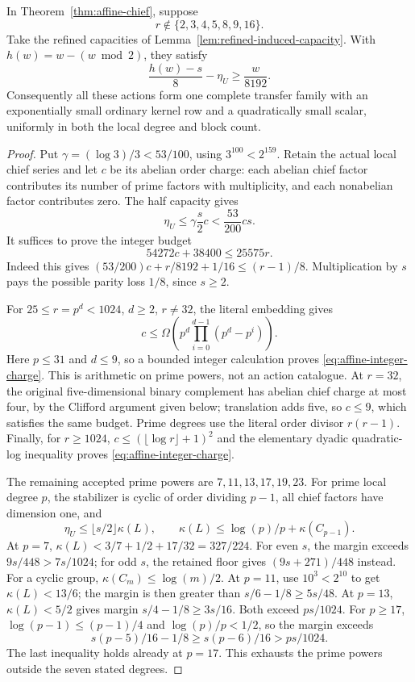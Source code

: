 \begin{theorem}
\label{thm:affine-local-capacity}
In Theorem~\ref{thm:affine-chief}, suppose
\[
 r\notin\{2,3,4,5,8,9,16\}.
\]
Take the refined capacities of Lemma~\ref{lem:refined-induced-capacity}.
With $h(w)=w-(w\bmod2)$, they satisfy
\[
 \frac{h(w)-s}{8}-\eta_U\geq\frac{w}{8192}.
\]
Consequently all these actions form one complete transfer family
with an exponentially small ordinary kernel row and a quadratically
small scalar, uniformly in both the local degree and block count.
\end{theorem}
\begin{proof}
Put $\gamma=(\log3)/3<53/100$, using $3^{100}<2^{159}$.
Retain the actual local chief series and let $c$ be its abelian order
charge: each abelian chief factor contributes its number of prime factors
with multiplicity, and each nonabelian factor contributes zero.
The half capacity gives
\[
 \eta_U\leq\gamma\frac{s}{2}c<\frac{53}{200}cs.
\]
It suffices to prove the integer budget
\begin{equation}\label{eq:affine-integer-charge}
 54272c+38400\leq25575r.
\end{equation}
Indeed this gives
$(53/200)c+r/8192+1/16\leq(r-1)/8$.
Multiplication by $s$ pays the possible parity loss $1/8$, since $s\geq2$.

For $25\leq r=p^d<1024$, $d\geq2$, $r\ne32$, the literal embedding gives
\[
 c\leq\Omega\!\left(p^d\prod_{i=0}^{d-1}(p^d-p^i)\right).
\]
Here $p\leq31$ and $d\leq9$, so a bounded integer calculation proves
\eqref{eq:affine-integer-charge}. This is arithmetic on prime powers,
not an action catalogue. At $r=32$, the original five-dimensional
binary complement has abelian chief charge at most four, by the
Clifford argument given below; translation adds five, so $c\leq9$,
which satisfies the same budget. Prime degrees use the literal order
divisor $r(r-1)$. Finally, for $r\geq1024$,
$c\leq(\lfloor\log r\rfloor+1)^2$ and the elementary dyadic
quadratic-log inequality proves \eqref{eq:affine-integer-charge}.

The remaining accepted prime powers are $7,11,13,17,19,23$.
For prime local degree $p$, the stabilizer is cyclic of order
dividing $p-1$, all chief factors have dimension one, and
\[
 \eta_U\leq\lfloor s/2\rfloor\kappa(L),\qquad
 \kappa(L)\leq\log(p)/p+\kappa(C_{p-1}).
\]
At $p=7$, $\kappa(L)<3/7+1/2+17/32=327/224$.
For even $s$, the margin exceeds $9s/448>7s/1024$;
for odd $s$, the retained floor gives $(9s+271)/448$ instead.
For a cyclic group, $\kappa(C_m)\leq\log(m)/2$.
At $p=11$, use $10^3<2^{10}$ to get $\kappa(L)<13/6$;
the margin is then greater than $s/6-1/8\geq5s/48$.
At $p=13$, $\kappa(L)<5/2$ gives margin
$s/4-1/8\geq3s/16$. Both exceed $ps/1024$.
For $p\geq17$, $\log(p-1)\leq(p-1)/4$ and
$\log(p)/p<1/2$, so the margin exceeds
\[
 s(p-5)/16-1/8\geq s(p-6)/16>ps/1024.
\]
The last inequality holds already at $p=17$. This exhausts the
prime powers outside the seven stated degrees.


\end{proof}
